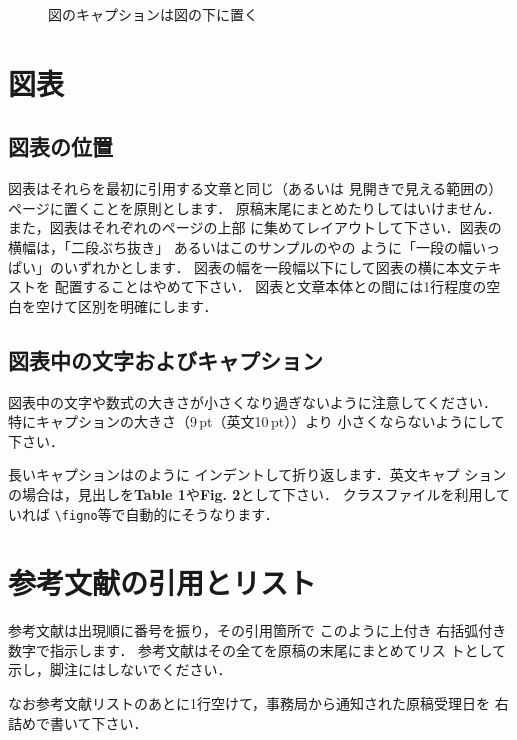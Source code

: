 \documentclass[dvipdfmx]{jsce}
\begin{document}
\begin{figure}
\begin{center}

\end{center}
\vspace*{-4mm}
\caption{図のキャプションは図の下に置く}\label{fig:1}
\end{figure}

\section{図表}

\subsection{図表の位置}

図表はそれらを最初に引用する文章と同じ（あるいは
見開きで見える範囲の）ページに置くことを原則とします．
原稿末尾にまとめたりしてはいけません．
また，図表はそれぞれのページの上部
に集めてレイアウトして下さい．図表の横幅は，「二段ぶち抜き」
あるいはこのサンプルの\tabno{\ref{tab:1}}や\figno{\ref{fig:1}}の
ように「一段の幅いっぱい」のいずれかとします．
図表の幅を一段幅以下にして図表の横に本文テキストを
配置することはやめて下さい．
図表と文章本体との間には1行程度の空白を空けて区別を明確にします．

\subsection{図表中の文字およびキャプション}

図表中の文字や数式の大きさが小さくなり過ぎないように注意してください．
特にキャプションの大きさ（9\,pt（英文10\,pt））より
小さくならないようにして下さい．

長いキャプションは\tabno{\ref{tab:1}}のように
インデントして折り返します．英文キャプ
ションの場合は，見出しを{\bf Table 1}や{\bf Fig. 2}として下さい．
クラスファイルを利用していれば \verb+\figno+等で自動的にそうなります．

\section{参考文献の引用とリスト}

参考文献は出現順に番号を振り，その引用箇所で
このように\cite{Hill1965,Blevins1998,Tsuchida1994,Karniadakis1998}上付き
右括弧付き数字で指示します．
参考文献はその全てを原稿の末尾にまとめてリス
トとして示し，脚注にはしないでください．

なお参考文献リストのあとに1行空けて，事務局から通知された原稿受理日を
右詰めで書いて下さい．
\end{document}
